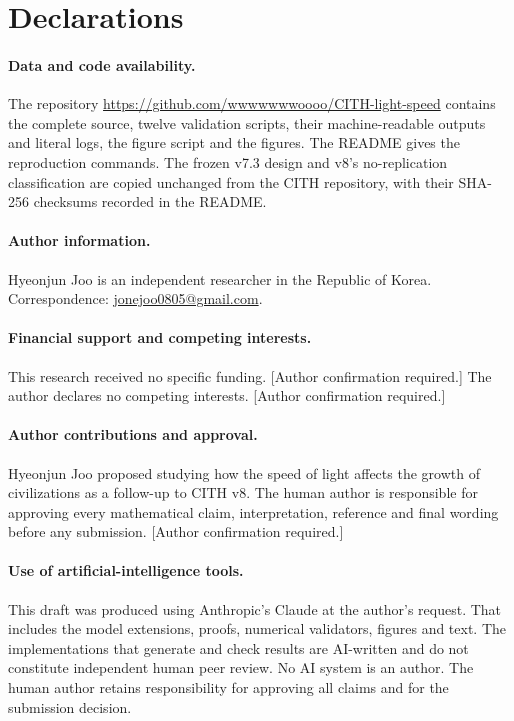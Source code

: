 \documentclass[11pt,a4paper]{article}
\theoremstyle{definition}
\newcommand{\CITH}{\textsc{CITH}}
\begin{document}
\section*{Declarations}
\paragraph{Data and code availability.}
The repository \url{https://github.com/wwwwwwwoooo/CITH-light-speed}
contains the complete source, twelve validation scripts, their
machine-readable outputs and literal logs, the figure script and the figures.
The README gives the reproduction commands. The frozen v7.3 design and v8's
no-replication classification are copied unchanged from the CITH repository,
with their SHA-256 checksums recorded in the README.
\paragraph{Author information.}
Hyeonjun Joo is an independent researcher in the Republic of Korea.
Correspondence: \href{mailto:jonejoo0805@gmail.com}{jonejoo0805@gmail.com}.
\paragraph{Financial support and competing interests.}
This research received no specific funding.
\textup{[Author confirmation required.]}
The author declares no competing interests.
\textup{[Author confirmation required.]}
\paragraph{Author contributions and approval.}
Hyeonjun Joo proposed studying how the speed of light affects the growth of
civilizations as a follow-up to \CITH{} v8. The human author is responsible
for approving every mathematical claim, interpretation, reference and final
wording before any submission.
\textup{[Author confirmation required.]}
\paragraph{Use of artificial-intelligence tools.}
This draft was produced using Anthropic's Claude at the author's request. That
includes the model extensions, proofs, numerical validators, figures and text.
The implementations that generate and check results are AI-written and do not
constitute independent human peer review. No AI system is an author. The human
author retains responsibility for approving all claims and for the submission
decision.
\end{document}
